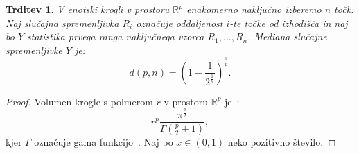 \documentclass[12pt,a4paper,twoside]{article}
\theoremstyle{definition} %
\theoremstyle{plain} %
\newtheorem{trditev}[definicija]{Trditev}
\numberwithin{equation}{section}  %
\begin{document}
\begin{trditev}
\label{trd:prekletstvo_dim}
	V enotski krogli v prostoru $\mathbb{R}^p$ enakomerno naključno izberemo $n$ točk.
	Naj slučajna spremenljivka $R_i$ označuje oddaljenost $i$-te točke od izhodišča in naj bo $Y$ statistika prvega ranga naključnega vzorca $R_1, \ldots, R_n$. %
	Mediana slučajne spremenljivke $Y$ je:
	\[
		d(p,n) = (1 - \frac{1}{2^{\frac{1}{n}}})^{\frac{1}{p}}.
	\]
\end{trditev}

\begin{proof}
	Volumen krogle s polmerom $r$ v prostoru $\mathbb{R}^p$ je~\cite[enačba~5.19.4]{nist_dlmf}:
	\begin{equation}
	\label{eq:volumen_krogle}
		r^p \frac{\pi^{\frac{p}{2}}}{\Gamma (\frac{p}{2}+1)},
	\end{equation}
	kjer $\Gamma$ označuje gama funkcijo~\cite[enačba~5.4.1]{nist_dlmf}. %
	Naj bo $x \in (0,1)$ neko pozitivno število.


\end{proof}
\end{document}
